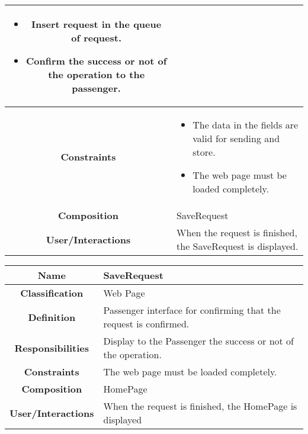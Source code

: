 \documentclass[11pt, a4paper,titlepage]{article}
\begin{document}
\begin{enumerate}
\begin{tabularx}{\textwidth}{| c | X |}
\begin{itemize}
		\item Insert request in the queue of request.
		\item Confirm the success or not of the operation to the passenger.
	\end{itemize}
	\\
	\hline
	\textbf{Constraints} & 
	\begin{itemize}
		\item The data in the fields are valid for sending and store.
		\item The web page must be loaded completely.
	\end{itemize}
	\\
	\hline
	\textbf{Composition} & 
	SaveRequest
	\\
	\hline
	\textbf{User/Interactions} & 
    When the request is finished, the SaveRequest is displayed.
	\\
	\hline	
\end{tabularx}

\begin{tabularx}{\textwidth}{| c | X |}
	\hline
	\textbf{Name} & 
	SaveRequest
	\\
	\hline
	\textbf{Classification} & 
	Web Page
	\\
	\hline
	\textbf{Definition} & 
	Passenger interface for confirming that the request is confirmed.
	\\
	\hline
	\textbf{Responsibilities} &
	Display to the Passenger the success or not of the operation.
	\\
	\hline
	\textbf{Constraints} & 
		 The web page must be loaded completely.
	\\
	\hline
	\textbf{Composition} & 
	HomePage
	\\
	\hline
	\textbf{User/Interactions} & 
	When the request is finished, the HomePage is displayed
	\\
	\hline	
\end{tabularx}


\end{enumerate}
\end{document}
